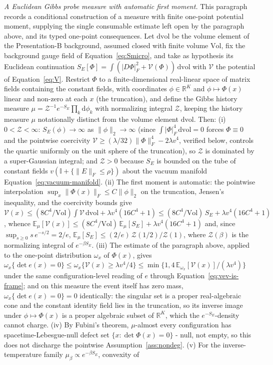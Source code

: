 
\emph{A Euclidean Gibbs probe measure with automatic first moment.} This paragraph records a conditional construction of a measure with finite one-point potential moment, supplying the single consumable estimate left open by the paragraph above, and its typed one-point consequences. Let \(\mathrm{dvol}\) be the volume element of the Presentation-B background, assumed closed with finite volume \(\mathrm{Vol}\), fix the background gauge field of Equation~\eqref{eq:Smicro}, and take as hypothesis its Euclidean continuation \(S_E[\Phi]=\int(\lvert D\Phi\rvert_F^2+\mathcal V(\Phi))\,\mathrm{dvol}\) with \(\mathcal V\) the potential of Equation~\eqref{eq:V}. Restrict \(\Phi\) to a finite-dimensional real-linear space of matrix fields containing the constant fields, with coordinates \(\phi\in\mathbb R^K\) and \(\phi\mapsto\Phi(x)\) linear and non-zero at each \(x\) (the truncation), and define the Gibbs history measure \(\mu=\mathcal Z^{-1}e^{-S_E}\prod_k\mathrm d\phi_k\) with normalizing integral \(\mathcal Z\), keeping the history measure \(\mu\) notationally distinct from the volume element \(\mathrm{dvol}\). Then: (i) \(0<\mathcal Z<\infty\): \(S_E(\phi)\to\infty\) as \(\lVert\phi\rVert_2\to\infty\) (since \(\int\lvert\Phi\rvert_F^4\,\mathrm{dvol}=0\) forces \(\Phi\equiv0\) and the pointwise coercivity \(\mathcal V\ge(\lambda/32)\lVert\Phi\rVert_F^4-2\lambda v^4\), verified below, controls the quartic uniformly on the unit sphere of the truncation), so \(\mathcal Z\) is dominated by a super-Gaussian integral; and \(\mathcal Z>0\) because \(S_E\) is bounded on the tube of constant fields \(v(\mathbb I+\{\lVert E\rVert_F\le\rho\})\) about the vacuum manifold Equation~\eqref{eq:vacuum-manifold}. (ii) The first moment is automatic: the pointwise interpolation \(\sup_x\lVert\Phi(x)\rVert_F\le C\lVert\phi\rVert_2\) on the truncation, Jensen's inequality, and the coercivity bounds give \(\mathcal V(x)\le(8C^4/\mathrm{Vol})\int\mathcal V\,\mathrm{dvol}+\lambda v^4(16C^4+1)\le(8C^4/\mathrm{Vol})\,S_E+\lambda v^4(16C^4+1)\), whence \(\mathbb E_\mu[\mathcal V(x)]\le(8C^4/\mathrm{Vol})\,\mathbb E_\mu[S_E]+\lambda v^4(16C^4+1)\) and, since \(\sup_{s\ge0}s\,e^{-s/2}=2/e\), \(\mathbb E_\mu[S_E]\le(2/e)\,\mathcal Z(1/2)/\mathcal Z(1)\), where \(\mathcal Z(\beta)\) is the normalizing integral of \(e^{-\beta S_E}\). (iii) The estimate of the paragraph above, applied to the one-point distribution \(\omega_x\) of \(\Phi(x)\), gives \(\omega_x\{\det e(x)=0\}\le\omega_x\{\mathcal V(x)\ge\lambda v^4/4\}\le\min\{1,4\,\mathbb E_{\omega_x}[\mathcal V(x)]/(\lambda v^4)\}\) under the same configuration-level reading of \(e\) through Equation~\eqref{eq:vev-is-frame}; and on this measure the event itself has zero mass, \(\omega_x\{\det e(x)=0\}=0\) identically: the singular set is a proper real-algebraic cone and the constant identity field lies in the truncation, so its inverse image under \(\phi\mapsto\Phi(x)\) is a proper algebraic subset of \(\mathbb R^K\), which the \(e^{-S_E}\)-density cannot charge. (iv) By Fubini's theorem, \(\mu\)-almost every configuration has spacetime-Lebesgue-null defect set \(\{x:\det\Phi(x)=0\}\) - null, not empty, so this does not discharge the pointwise Assumption~\ref{ass:nondeg}. (v) For the inverse-temperature family \(\mu_\beta\propto e^{-\beta S_E}\), convexity of 